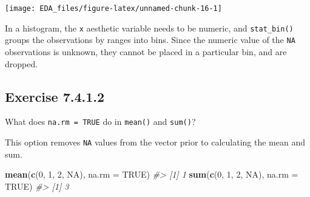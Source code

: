 \documentclass[]{book}
\newenvironment{Shaded}{\begin{snugshade}}{\end{snugshade}}
\newcommand{\CommentTok}[1]{\textcolor[rgb]{0.56,0.35,0.01}{\textit{#1}}}
\newcommand{\DataTypeTok}[1]{\textcolor[rgb]{0.13,0.29,0.53}{#1}}
\newcommand{\DecValTok}[1]{\textcolor[rgb]{0.00,0.00,0.81}{#1}}
\newcommand{\FloatTok}[1]{\textcolor[rgb]{0.00,0.00,0.81}{#1}}
\newcommand{\KeywordTok}[1]{\textcolor[rgb]{0.13,0.29,0.53}{\textbf{#1}}}
\newcommand{\NormalTok}[1]{#1}
\newcommand{\OperatorTok}[1]{\textcolor[rgb]{0.81,0.36,0.00}{\textbf{#1}}}
\newcommand{\OtherTok}[1]{\textcolor[rgb]{0.56,0.35,0.01}{#1}}
\newcommand{\StringTok}[1]{\textcolor[rgb]{0.31,0.60,0.02}{#1}}
\theoremstyle{plain}
\theoremstyle{remark}
\begin{document}
\begin{Shaded}
\end{Shaded}

\begin{center}\texttt{[image: EDA\_files/figure-latex/unnamed-chunk-16-1]} \end{center}

In a histogram, the \texttt{x} aesthetic variable needs to be numeric,
and \texttt{stat\_bin()} groups the observations by ranges into bins.
Since the numeric value of the \texttt{NA} observations is unknown, they
cannot be placed in a particular bin, and are dropped.

\hypertarget{exercise-7.4.1.2}{%
\subsection*{\texorpdfstring{Exercise
{7.4.1.2}}{Exercise 7.4.1.2}}\label{exercise-7.4.1.2}}

What does \texttt{na.rm\ =\ TRUE} do in \texttt{mean()} and
\texttt{sum()}?

This option removes \texttt{NA} values from the vector prior to
calculating the mean and sum.

\begin{Shaded}
\begin{Highlighting}[]
\KeywordTok{mean}\NormalTok{(}\KeywordTok{c}\NormalTok{(}\DecValTok{0}\NormalTok{, }\DecValTok{1}\NormalTok{, }\DecValTok{2}\NormalTok{, }\OtherTok{NA}\NormalTok{), }\DataTypeTok{na.rm =} \OtherTok{TRUE}\NormalTok{)}
\CommentTok{#> [1] 1}
\KeywordTok{sum}\NormalTok{(}\KeywordTok{c}\NormalTok{(}\DecValTok{0}\NormalTok{, }\DecValTok{1}\NormalTok{, }\DecValTok{2}\NormalTok{, }\OtherTok{NA}\NormalTok{), }\DataTypeTok{na.rm =} \OtherTok{TRUE}\NormalTok{)}
\CommentTok{#> [1] 3}
\end{Highlighting}
\end{Shaded}
\end{document}
